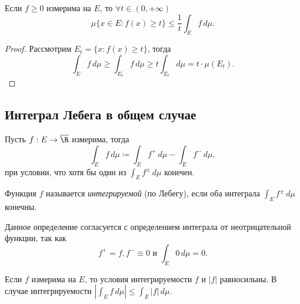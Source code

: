\begin{theorem}
    Если $f \ge 0$ измерима на $E$, то $\forall t \in (0, +\infty)$
    \[
        \mu\{x \in E : f(x) \ge t\} \le \frac{1}{t} \int_E f \, d\mu.
    \]

    \begin{proof}
        Рассмотрим $E_t = \{x : f(x) \ge t\}$, тогда
        \[
            \int_E f \, d\mu \ge \int_{E_t} f \, d\mu \ge t\int_{E_t} d\mu = t \cdot \mu(E_t).
        \]
    \end{proof}
\end{theorem}

\subsection{Интеграл Лебега в общем случае}

\begin{definition}
    Пусть $f : E \rightarrow \overline{\R}$ измерима, тогда
    \[
        \int_E f \, d\mu \coloneqq \int_E f^+ \, d\mu - \int_E f^- \, d\mu,
    \]
    при условии, что хотя бы один из $\int_E f^\pm \, d\mu$ конечен.

    Функция $f$ называется \emph{интегрируемой} (по Лебегу), если оба интеграла $\int_E f^\pm \, d\mu$ конечны.
\end{definition}

\begin{note}
    Данное определение согласуется с определением интеграла от неотрицательной функции, так как
    \[
        f^+ = f, f^- \equiv 0 \text{ и } \int_E 0 \, d\mu = 0.
    \]
\end{note}

\begin{note}
    Если $f$ измерима на $E$, то условия интегрируемости $f$ и $|f|$ равносильны. В случае интегрируемости $\left|\int_E f \, d\mu\right| \le \int_E |f| \, d\mu$.
\end{note}